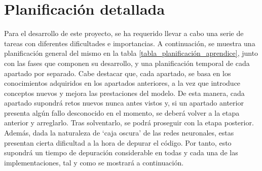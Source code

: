 
\chapter{Planificación detallada} \label{planificacion}

Para el desarrollo de este proyecto, se ha requerido llevar a cabo una serie de tareas con diferentes dificultades e importancias. A continuación, se muestra una planificación general del mismo en la tabla \ref{tabla_planificación_aprendice}, junto con las fases que componen su desarrollo, y una planificación temporal de cada apartado por separado. Cabe destacar que, cada apartado, se basa en los conocimientos adquiridos en los apartados anteriores, a la vez que introduce conceptos nuevos y mejora las prestaciones del modelo. De esta manera, cada apartado supondrá retos nuevos nunca antes vistos y, si un apartado anterior presenta algún fallo desconocido en el momento, se deberá volver a la etapa anterior y arreglarlo. Tras solventarlo, se podrá proseguir con la etapa posterior. Además, dada la naturaleza de `caja oscura' de las redes neuronales, estas presentan cierta dificultad a la hora de depurar el código. Por tanto, esto supondrá un tiempo de depuración considerable en todas y cada una de las implementaciones, tal y como se mostrará a continuación.

